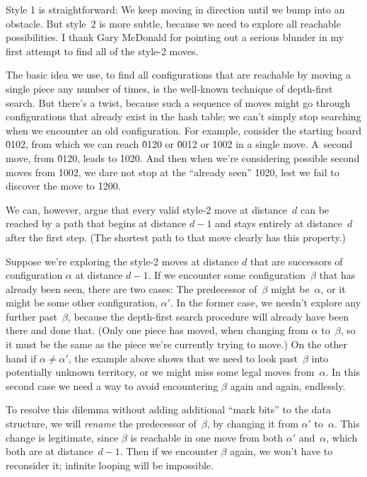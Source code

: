 Style 1 is straightforward: We keep moving in direction %
 until we
bump into an obstacle. But style~2 is more subtle, because we need to explore
all reachable possibilities. I thank Gary McDonald for pointing out a
serious blunder in my first attempt to find all of the style-2 moves.

The basic idea we use, to find all configurations that are reachable by
moving a single piece any number of times, is the well-known technique
of depth-first search. But there's a twist, because such a sequence of
moves might go through configurations that already exist in the hash table;
we can't simply stop searching when we encounter an old configuration.
For example, consider the starting board \.{0102}, from which we can
reach \.{0120} or \.{0012} or \.{1002} in a single move. A~second move,
from \.{0120}, leads to \.{1020}. And then when we're considering
possible second moves from \.{1002}, we dare not stop at the
``already seen'' \.{1020}, lest we fail to discover the move to \.{1200}.

We can, however, argue that every valid style-2 move at distance~$d$ can be
reached by a path that begins at distance $d-1$ and stays entirely at
distance~$d$ after the first step. (The shortest path to that move
clearly has this property.)

Suppose we're exploring the style-2 moves at distance $d$ that are successors
of configuration $\alpha$ at distance $d-1$. If we encounter some
configuration~$\beta$ that has already been seen, there are two cases:
The predecessor of~$\beta$ might be~$\alpha$, or it might be some other
configuration, $\alpha'$. In the former case, we needn't explore any
further past~$\beta$, because the depth-first search procedure will already
have been there and done that. (Only one piece has moved, when changing
from $\alpha$ to~$\beta$, so it must be the same as the piece we're currently
trying to move.) On the other hand if $\alpha\ne\alpha'$, the example above
shows that we need to look past~$\beta$ into potentially unknown territory, or
we might miss some legal moves from~$\alpha$. In this second case we
need a way to avoid encountering $\beta$ again and again, endlessly.

To resolve this dilemma without adding additional ``mark bits'' to the data
structure, we will {\it rename\/} the predecessor of~$\beta$, by changing it
from $\alpha'$ to~$\alpha$. This change is legitimate, since $\beta$ is
reachable in one move from both $\alpha'$ and~$\alpha$, which both are at
distance~$d-1$. Then if we encounter $\beta$ again, we won't have to
reconsider it; infinite looping will be impossible.

